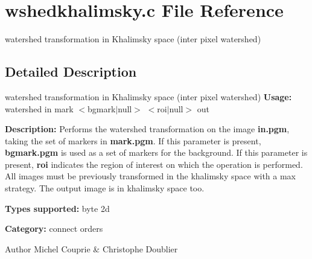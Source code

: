 \section{wshedkhalimsky.c File Reference}
\label{wshedkhalimsky_8c}


watershed transformation in Khalimsky space (inter pixel watershed)  




\subsection{Detailed Description}
watershed transformation in Khalimsky space (inter pixel watershed) {\bfseries Usage:} watershed in mark $<$bgmark$|$null$>$ $<$roi$|$null$>$ out

{\bfseries Description:} Performs the watershed transformation on the image {\bfseries in.pgm}, taking the set of markers in {\bfseries mark.pgm}. If this parameter is present, {\bfseries bgmark.pgm} is used as a set of markers for the background. If this parameter is present, {\bfseries roi} indicates the region of interest on which the operation is performed. All images must be previously transformed in the khalimsky space with a max strategy. The output image is in khalimsky space too.

{\bfseries Types supported:} byte 2d

{\bfseries Category:} connect orders

\begin{DoxyAuthor}{Author}
Michel Couprie \& Christophe Doublier 
\end{DoxyAuthor}
